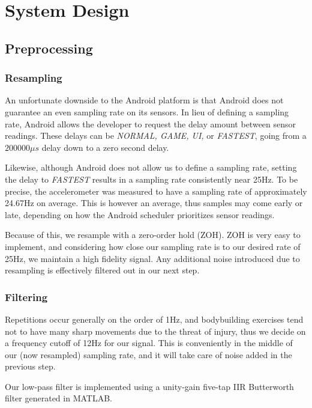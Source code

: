 \chapter{System Design}

\section{Preprocessing}

\subsection{Resampling}
An unfortunate downside to the Android platform is that Android does not guarantee an even sampling rate on its sensors. In lieu of defining a sampling rate, Android allows the developer to request the delay amount between sensor readings. These delays can be \textit{NORMAL, GAME, UI,} or \textit{FASTEST}, going from a $200000\mu s$ delay down to a zero second delay.

Likewise, although Android does not allow us to define a sampling rate, setting the delay to \textit{FASTEST} results in a sampling rate consistently near 25Hz. To be precise, the accelerometer was measured to have a sampling rate of approximately 24.67Hz on average. This is however an average, thus samples may come early or late, depending on how the Android scheduler prioritizes sensor readings. 

Because of this, we resample with a zero-order hold (ZOH). ZOH is very easy to implement, and considering how close our sampling rate is to our desired rate of 25Hz, we maintain a high fidelity signal. Any additional noise introduced due to resampling is effectively filtered out in our next step.

\subsection{Filtering}
Repetitions occur generally on the order of 1Hz, and bodybuilding exercises tend not to have many sharp movements due to the threat of injury, thus we decide on a frequency cutoff of 12Hz for our signal. This is conveniently in the middle of our (now resampled) sampling rate, and it will take care of noise added in the previous step.

Our low-pass filter is implemented using a unity-gain five-tap IIR Butterworth filter generated in MATLAB.


